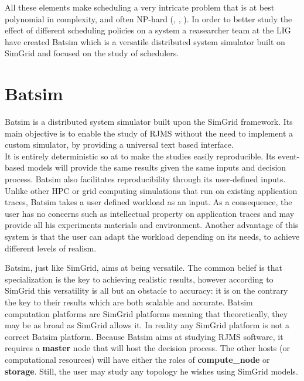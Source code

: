 All these elements make scheduling a very intricate problem that is at best
polynomial in complexity, and often NP-hard
(\cite{10.1016/S0022-0000(75)80008-0}, \cite{scheduler-complexity}, \cite{BLAZEWICZ198311}). In order
to better study the effect of different scheduling policies on a system a
reasearcher team at the LIG have created Batsim which is a versatile
distributed system simulator built on SimGrid and focused on the study of
schedulers.

\section{Batsim}

Batsim\cite{dutot:hal-01333471} is a distributed system simulator built upon
the SimGrid framework. Its main objective is to enable the study of RJMS
without the need to implement a custom simulator, by providing a universal text
based interface. \\

It is entirely deterministic so at to make the studies easily reproducible.
Its event-based models will provide the same results given the same inputs and
decision process. Batsim also facilitates reproducibility through its
user-defined inputs. Unlike other HPC or grid computing simulations that run on
existing application traces, Batsim takes a user defined workload as an input.
As a consequence, the user has no concerns such as intellectual property on
application traces and may provide all his experiments materials and
environment.  Another advantage of this system is that the user can adapt the
workload depending on its needs, to achieve different levels of realism.

Batsim, just like SimGrid, aims at being versatile. The common belief is that
specialization is the key to achieving realistic results, however according to
SimGrid this versatility is all but an obstacle to
accuracy\cite{casanova:hal-01017319}: it is on the contrary the key to their
results which are both scalable and accurate. Batsim computation platforms are
SimGrid platforms meaning that theoretically, they may be as broad as SimGrid
allows it. In reality any SimGrid platform is not a correct Batsim platform.
Because Batsim aims at studying RJMS software, it requires a \textbf{master}
node that will host the decision process. The other hosts (or computational
resources) will have either the roles of \textbf{compute\_node} or
\textbf{storage}. Still, the user may study any topology he wishes using
SimGrid models.

